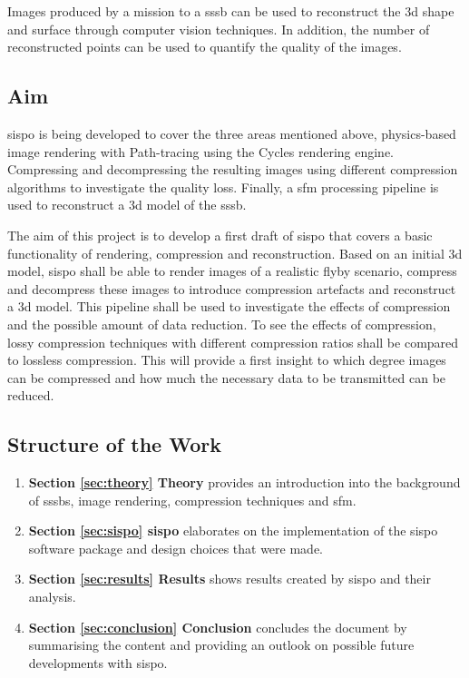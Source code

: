 Images produced by a mission to a \gls{sssb} can be used to reconstruct the \gls{3d} shape and surface through computer vision techniques. In addition, the number of reconstructed points can be used to quantify the quality of the images.

\subsection{Aim}
\gls{sispo} is being developed to cover the three areas mentioned above, physics-based image rendering with Path-tracing using the Cycles rendering engine. Compressing and decompressing the resulting images using different compression algorithms to investigate the quality loss. Finally, a \gls{sfm} processing pipeline is used to reconstruct a \gls{3d} model of the \gls{sssb}.

The aim of this project is to develop a first draft of \gls{sispo} that covers a basic functionality of rendering, compression and reconstruction. Based on an initial \gls{3d} model, \gls{sispo} shall be able to render images of a realistic flyby scenario, compress and decompress these images to introduce compression artefacts and reconstruct a \gls{3d} model. This pipeline shall be used to investigate the effects of compression and the possible amount of data reduction. To see the effects of compression, lossy compression techniques with different compression ratios shall be compared to lossless compression. This will provide a first insight to which degree images can be compressed and how much the necessary data to be transmitted can be reduced.

\subsection{Structure of the Work}

\begin{enumerate}
    \item \textbf{Section \ref{sec:theory} Theory} provides an introduction into the background of \glspl{sssb}, image rendering, compression techniques and \gls{sfm}.
    \item \textbf{Section \ref{sec:sispo} \gls{sispo}} elaborates on the implementation of the \gls{sispo} software package and design choices that were made.
    \item \textbf{Section \ref{sec:results} Results} shows results created by \gls{sispo} and their analysis.
    \item \textbf{Section \ref{sec:conclusion} Conclusion} concludes the document by summarising the content and providing an outlook on possible future developments with \gls{sispo}.
\end{enumerate}

